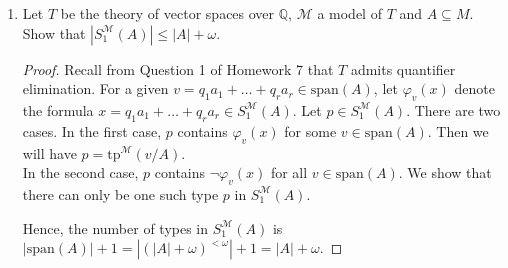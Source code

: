 \documentclass{article}
\begin{document}
\begin{enumerate}[label={\bf Q\arabic*:}]
  \item Let $T$ be the theory of vector spaces over $\mathbb{Q}$,
    $\mathcal{M}$ a model of $T$ and $A\subseteq M$. Show that
    $|S^{\mathcal{M}}_1(A)|\leq|A|+\omega$.

    \begin{proof}
      Recall from Question 1 of Homework 7 that $T$ admits quantifier
      elimination. For a given $v=q_1a_1+\ldots+q_ra_r\in\text{span}(A)$,
      let $\varphi_v(x)$ denote the formula $x=q_1a_1+\ldots+q_ra_r\in
      S^\mathcal{M}_1(A)$. Let $p\in S^\mathcal{M}_1(A)$. There are two
      cases. In the first case, $p$ contains $\varphi_v(x)$ for some
      $v\in\text{span}(A)$. Then we will have
      $p=\text{tp}^\mathcal{M}(v/A)$. \\

      In the second case, $p$ contains $\neg\varphi_v(x)$ for all
      $v\in\text{span}(A)$. We show that there can only be one such type
      $p$ in $S^\mathcal{M}_1(A)$.

      Hence, the number of types in $S^\mathcal{M}_1(A)$ is
      $|\text{span}(A)|+1=|(|A|+\omega)^{<\omega}|+1=|A|+\omega$.



    \end{proof}


\end{enumerate}
\end{document}
